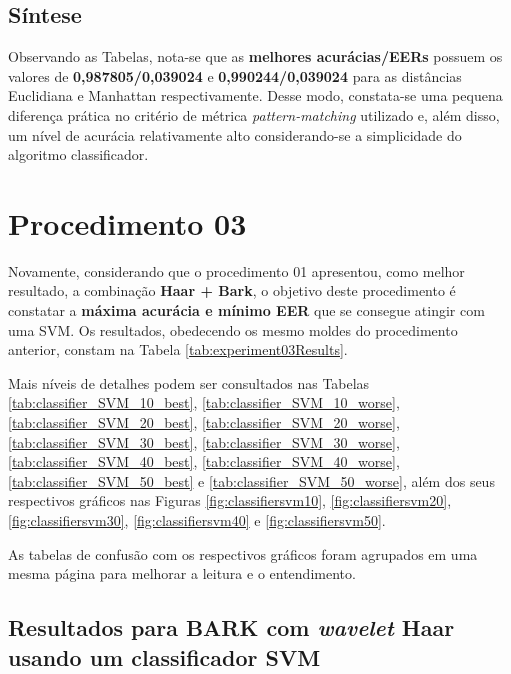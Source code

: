 		\subsection{Síntese}
			\par Observando as Tabelas, nota-se que as \textbf{melhores acurácias/EERs} possuem os valores de \textbf{0,987805/0,039024} e \textbf{0,990244/0,039024} para as distâncias Euclidiana e Manhattan respectivamente. Desse modo, constata-se uma pequena diferença prática no critério de métrica \textit{pattern-matching} utilizado e, além disso, um nível de acurácia relativamente alto considerando-se a simplicidade do algoritmo classificador.

	\section{Procedimento 03}
		\label{chap:testsResults:sec:Experimento03}
		\par Novamente, considerando que o procedimento 01 apresentou, como melhor resultado, a combinação \textbf{Haar + Bark}, o objetivo deste procedimento é constatar a \textbf{máxima acurácia e mínimo EER} que se consegue atingir com uma SVM. Os resultados, obedecendo os mesmo moldes do procedimento anterior, constam na Tabela \ref{tab:experiment03Results}.\\
		
		\par Mais níveis de detalhes podem ser consultados nas Tabelas \ref{tab:classifier_SVM_10_best}, \ref{tab:classifier_SVM_10_worse}, \ref{tab:classifier_SVM_20_best}, \ref{tab:classifier_SVM_20_worse}, \ref{tab:classifier_SVM_30_best}, \ref{tab:classifier_SVM_30_worse}, \ref{tab:classifier_SVM_40_best}, \ref{tab:classifier_SVM_40_worse}, \ref{tab:classifier_SVM_50_best} e \ref{tab:classifier_SVM_50_worse}, além dos seus respectivos gráficos nas Figuras \ref{fig:classifiersvm10}, \ref{fig:classifiersvm20}, \ref{fig:classifiersvm30}, \ref{fig:classifiersvm40} e \ref{fig:classifiersvm50}.

		
		
		\par As tabelas de confusão com os respectivos gráficos foram agrupados em uma mesma página para melhorar a leitura e o entendimento.

		\subsection{Resultados para BARK com \textit{wavelet} Haar usando um classificador SVM}
			
			
			
			
			

